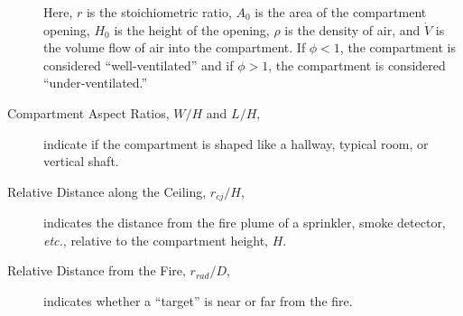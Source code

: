 \begin{description}
\ee
Here, $r$ is the stoichiometric ratio, $A_0$ is the area of the compartment opening, $H_0$ is the height of the opening, $\rho$ is the density of air, and $\dot{V}$ is the
volume flow of air into the compartment. If $\phi<1$, the compartment is considered ``well-ventilated'' and if $\phi>1$, the compartment is considered ``under-ventilated.''
\item[Compartment Aspect Ratios, $W/H$ and $L/H$,] indicate if the compartment is shaped like a hallway, typical room, or vertical shaft.
\item[Relative Distance along the Ceiling, $r_{cj}/H$,] indicates the distance from the fire plume of a sprinkler, smoke detector, {\em etc.}, relative to the
compartment height, $H$.
\item[Relative Distance from the Fire, $r_{rad}/D$,] indicates whether a ``target'' is near or far from the fire.
\end{description}

